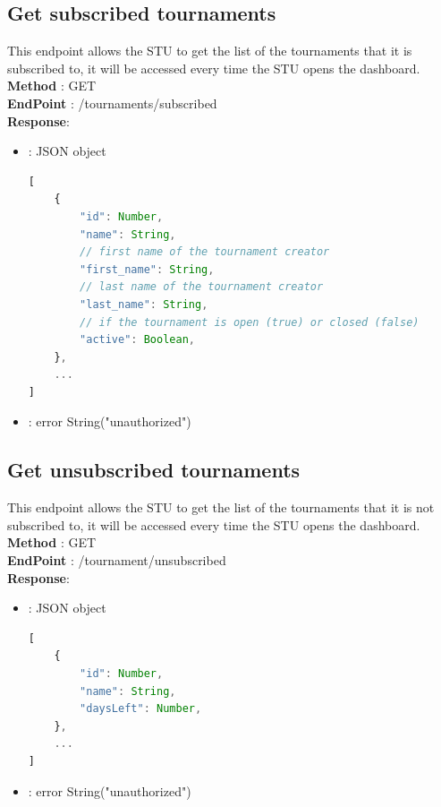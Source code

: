 \subsection*{Get subscribed tournaments}
This endpoint allows the STU to get the list of the tournaments that it is subscribed to, it will be accessed every time the STU opens the dashboard.\\
\textbf{Method} : GET \\
\textbf{EndPoint} : /tournaments/subscribed     \\
\textbf{Response}:
    \begin{itemize}
        \item {} : JSON object 
        \begin{lstlisting}[language=JavaScript, label={lst:jscode}, basicstyle=\ttfamily]
[
    {
        "id": Number,
        "name": String,
        // first name of the tournament creator
        "first_name": String,
        // last name of the tournament creator
        "last_name": String,
        // if the tournament is open (true) or closed (false)
        "active": Boolean,
    },
    ...
]
            \end{lstlisting}
        \item {} : error String("unauthorized") 
    \end{itemize}

\subsection*{Get unsubscribed tournaments}
This endpoint allows the STU to get the list of the tournaments that it is not subscribed to, it will be accessed every time the STU opens the dashboard.\\
\textbf{Method} : GET \\
\textbf{EndPoint} : /tournament/unsubscribed     \\
\textbf{Response}:
    \begin{itemize}
        \item {} : JSON object
        \begin{lstlisting}[language=JavaScript, label={lst:jscode}, basicstyle=\ttfamily]
[
    {
        "id": Number,
        "name": String,
        "daysLeft": Number,
    },
    ...
]
        \end{lstlisting}
        \item {} : error String("unauthorized") 
        \end{itemize}

